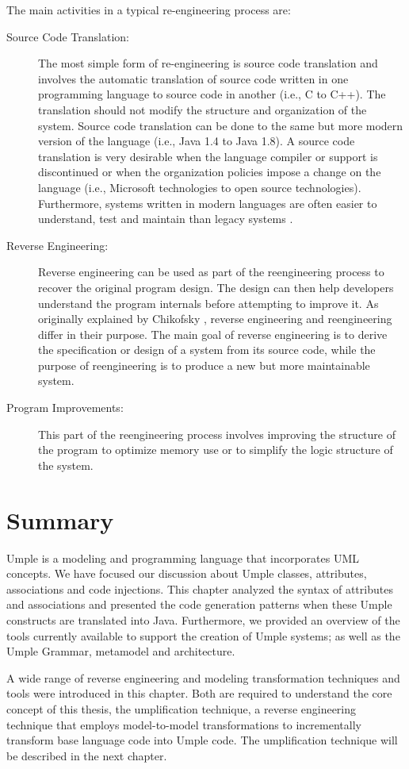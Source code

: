 The main activities in a typical re-engineering process are:

\begin{description}
\item[Source Code Translation:]
The most simple form of re-engineering is source code translation and involves the automatic translation of source code written in one programming language to source code in another (i.e., C to C++). The translation should not modify the structure and organization of the system. Source code translation can be done to the same but more modern version of the language (i.e., Java 1.4 to Java 1.8). A source code translation is very desirable when the language compiler or support is discontinued or when the organization policies impose a change on the language (i.e., Microsoft technologies to open source technologies). Furthermore, systems written in modern languages are often easier to understand, test and maintain than legacy systems \cite{Pressman2001}.

\item[Reverse Engineering:]
Reverse engineering can be used as part of the reengineering process to recover the original program design. The design can then help developers understand the program internals before attempting to improve it. As originally explained by Chikofsky  \cite{Chikofsky}, reverse engineering and reengineering differ in their purpose. The main goal of reverse engineering is to derive the specification or design of a system from its source code, while the purpose of reengineering is to produce a new but more maintainable system. 

\item[Program Improvements:]
This part of the reengineering process involves improving the structure of the program to optimize memory use or to simplify the logic structure of the system. 
\end{description}

\section{Summary}

Umple is a modeling and programming language that incorporates UML concepts. We have focused our discussion about Umple classes, attributes, associations and code injections. This chapter analyzed the syntax of attributes and associations and presented the code generation patterns when these Umple constructs are translated into Java. Furthermore, we provided an overview of the tools currently available to support the creation of Umple systems; as well as the Umple Grammar, metamodel and architecture.

A wide range of reverse engineering and modeling transformation techniques and tools were introduced in this chapter. Both are required to understand the core concept of this thesis, the umplification technique, a reverse engineering technique that employs model-to-model transformations to  incrementally transform base language code into Umple code. The umplification technique will be described in the next chapter.